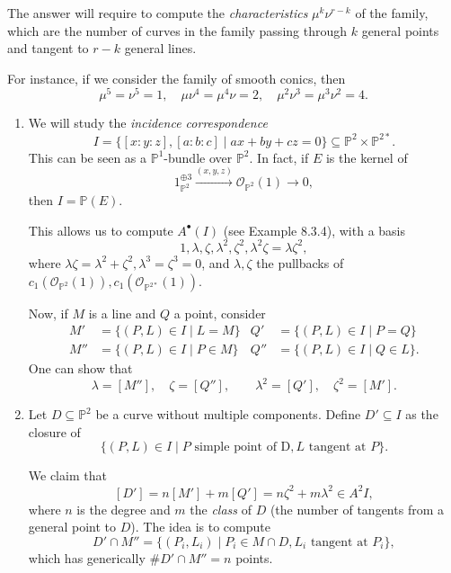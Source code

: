 \documentclass[leqno, openany]{memoir}
\theoremstyle{definition}
\theoremstyle{remark}
\theoremstyle{plain}
\theoremstyle{definition}
\theoremstyle{remark}
\renewcommand{\P}{\mathbb{P}}
\newcommand{\msc}[1]{\mathscr{#1}}
\begin{document}
The answer will require to compute the \emph{characteristics} $\mu^k \nu^{r-k}$ of the family, which are the number of curves in the family passing through $k$ general points and tangent to $r-k$ general lines. 

For instance, if we consider the family of smooth conics, then
\[ \mu^5 = \nu^5 = 1, \quad \mu\nu^4=\mu^4\nu=2, \quad \mu^2\nu^3=\mu^3\nu^2=4. \]

\begin{enumerate}
    \item We will study the \emph{incidence correspondence} 
\[ I=\{[x:y:z], [a:b:c] \mid ax+by+cz=0\} \subseteq \P^2 \times \P^{2\ast}. \]
This can be seen as a $\P^1$-bundle over $\P^2$. In fact, if $E$ is the kernel of
\[ 1_{\P^2}^{\oplus 3} \xrightarrow{(x, y, z)} \msc{O}_{\P^2}(1) \to 0, \]
then $I=\P(E)$. 

This allows us to compute $A^\bullet(I)$ (see Example 8.3.4), with a basis 
\[ 1, \lambda, \zeta, \lambda^2, \zeta^2, \lambda^2\zeta=\lambda\zeta^2, \]
where $\lambda\zeta=\lambda^2+\zeta^2, \lambda^3=\zeta^3=0$, and $\lambda, \zeta$ the pullbacks of $c_1(\msc{O}_{\P^2}(1)), c_1(\msc{O}_{\P^{2\ast}}(1))$. 

Now, if $M$ is a line and $Q$ a point, consider
\begin{align*}
M' &= \{(P, L) \in I \mid L=M\} & Q' &= \{(P, L) \in I \mid P=Q\} \\
M'' &= \{(P, L) \in I \mid P \in M\} & Q'' &= \{(P, L) \in I \mid Q \in L\}.
\end{align*}
One can show that
\[ \lambda=[M''], \quad \zeta = [Q''], \qquad \lambda^2=[Q'], \quad \zeta^2 = [M']. \]
    \item Let $D \subseteq \P^2$ be a curve without multiple components. Define $D' \subseteq I$ as the closure of
\[ \{(P, L) \in I \mid P \text{ simple point of D}, L \text{ tangent at }P\}. \]

We claim that
\[ [D'] = n[M']+m[Q'] = n\zeta^2+m \lambda^2 \in A^2I, \]
where $n$ is the degree and $m$ the \emph{class} of $D$ (the number of tangents from a general point to $D$). The idea is to compute 
\[ D' \cap M'' = \{(P_i, L_i) \mid P_i \in M \cap D, L_i \text{ tangent at }P_i\}, \]
which has generically $\# D' \cap M''=n$ points.  


\end{enumerate}
\end{document}
